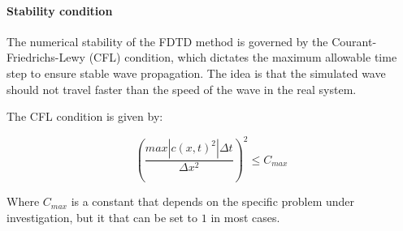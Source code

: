 \paragraph{Stability condition}

The numerical stability of the FDTD method is governed by the Courant-Friedrichs-Lewy (CFL) condition, which dictates the maximum allowable time step to ensure stable wave propagation.
The idea is that the simulated wave should not travel faster than the speed of the wave in the real system.

The CFL condition is given by:

\begin{equation}
    \left( \frac{max|c(x, t)^2| \Delta t}{\Delta x^2} \right)^2 \leq C_{max}
\end{equation}

Where $C_{max}$ is a constant that depends on the specific problem under investigation, but it that can be set to $1$ in most cases.
